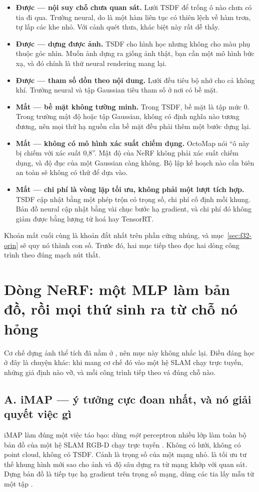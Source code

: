 \documentclass[../../deep_learning.tex]{subfiles}
\begin{document}
\begin{itemize}
\item \textbf{Được --- nội suy chỗ chưa quan sát.} Lưới TSDF để trống ô nào chưa có tia đi qua. Trường neural, do là một hàm liên tục có thiên lệch về hàm trơn, tự lấp các khe nhỏ. Với cảnh quét thưa, khác biệt này rất dễ thấy.
\item \textbf{Được --- dựng được ảnh.} TSDF cho hình học nhưng không cho màu phụ thuộc góc nhìn. Muốn ảnh dựng ra giống ảnh thật, bạn cần một mô hình bức xạ, và đó chính là thứ neural rendering mang lại.
\item \textbf{Được --- tham số dồn theo nội dung.} Lưới đều tiêu bộ nhớ cho cả không khí. Trường neural và tập Gaussian tiêu tham số ở nơi có bề mặt.
\item \textbf{Mất --- bề mặt không tường minh.} Trong TSDF, bề mặt là tập mức 0. Trong trường mật độ hoặc tập Gaussian, không có định nghĩa nào tương đương, nên mọi thứ hạ nguồn cần bề mặt đều phải thêm một bước dựng lại.
\item \textbf{Mất --- không có mô hình xác suất chiếm dụng.} OctoMap nói ``ô này bị chiếm với xác suất 0,8''. Mật độ của NeRF không phải xác suất chiếm dụng, và độ đục của một Gaussian càng không. Bộ lập kế hoạch nào cần biên an toàn sẽ không có thứ để dựa vào.
\item \textbf{Mất --- chi phí là vòng lặp tối ưu, không phải một lượt tích hợp.} TSDF cập nhật bằng một phép trộn có trọng số, chi phí cố định mỗi khung. Bản đồ neural cập nhật bằng vài chục bước hạ gradient, và chi phí đó không giảm được bằng lượng tử hoá hay TensorRT.
\end{itemize}

Khoản mất cuối cùng là khoản đắt nhất trên phần cứng nhúng, và mục~\ref{sec:f32-orin} sẽ quy nó thành con số. Trước đó, hai mục tiếp theo đọc hai dòng công trình theo đúng mạch nút thắt.

\section{Dòng NeRF: một MLP làm bản đồ, rồi mọi thứ sinh ra từ chỗ nó hỏng}
Cơ chế dựng ảnh thể tích đã nằm ở , nên mục này không nhắc lại. Điều đáng học ở đây là chuyện khác: khi mang cơ chế đó vào một hệ SLAM chạy trực tuyến, những giả định nào vỡ, và mỗi công trình tiếp theo vá đúng chỗ nào.

\subsection{A. iMAP --- ý tưởng cực đoan nhất, và nó giải quyết việc gì}
iMAP làm đúng một việc táo bạo: dùng \emph{một} perceptron nhiều lớp làm toàn bộ bản đồ của một hệ SLAM RGB-D chạy trực tuyến \cite{f32imap2021}. Không có lưới, không có point cloud, không có TSDF. Cảnh là trọng số của một mạng nhỏ.  là tối ưu tư thế khung hình mới sao cho ảnh và độ sâu dựng ra từ mạng khớp với quan sát. Dựng bản đồ là tiếp tục hạ gradient trên trọng số mạng, dùng các tia lấy mẫu từ một tập .
\end{document}

